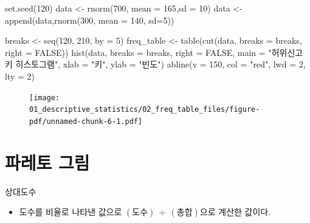 \documentclass[
  letterpaper,
  DIV=11,
  numbers=noendperiod]{scrreprt}
\newenvironment{Shaded}{\begin{snugshade}}{\end{snugshade}}
\newcommand{\AttributeTok}[1]{\textcolor[rgb]{0.40,0.45,0.13}{#1}}
\newcommand{\ConstantTok}[1]{\textcolor[rgb]{0.56,0.35,0.01}{#1}}
\newcommand{\DecValTok}[1]{\textcolor[rgb]{0.68,0.00,0.00}{#1}}
\newcommand{\FunctionTok}[1]{\textcolor[rgb]{0.28,0.35,0.67}{#1}}
\newcommand{\NormalTok}[1]{\textcolor[rgb]{0.00,0.23,0.31}{#1}}
\newcommand{\OtherTok}[1]{\textcolor[rgb]{0.00,0.23,0.31}{#1}}
\newcommand{\StringTok}[1]{\textcolor[rgb]{0.13,0.47,0.30}{#1}}
\providecommand{\tightlist}{%
  \setlength{\itemsep}{0pt}\setlength{\parskip}{0pt}}\usepackage{longtable,booktabs,array}
\begin{document}
\begin{Shaded}
\begin{Highlighting}[]
\FunctionTok{set.seed}\NormalTok{(}\DecValTok{120}\NormalTok{)}
\NormalTok{data }\OtherTok{\textless{}{-}} \FunctionTok{rnorm}\NormalTok{(}\DecValTok{700}\NormalTok{, }\AttributeTok{mean =} \DecValTok{165}\NormalTok{,}\AttributeTok{sd =} \DecValTok{10}\NormalTok{)}
\NormalTok{data }\OtherTok{\textless{}{-}} \FunctionTok{append}\NormalTok{(data,}\FunctionTok{rnorm}\NormalTok{(}\DecValTok{300}\NormalTok{, }\AttributeTok{mean =} \DecValTok{140}\NormalTok{, }\AttributeTok{sd=}\DecValTok{5}\NormalTok{))}


\NormalTok{breaks }\OtherTok{\textless{}{-}} \FunctionTok{seq}\NormalTok{(}\DecValTok{120}\NormalTok{, }\DecValTok{210}\NormalTok{, }\AttributeTok{by =} \DecValTok{5}\NormalTok{)}
\NormalTok{freq\_table }\OtherTok{\textless{}{-}} \FunctionTok{table}\NormalTok{(}\FunctionTok{cut}\NormalTok{(data, }\AttributeTok{breaks =}\NormalTok{ breaks, }\AttributeTok{right =} \ConstantTok{FALSE}\NormalTok{))}
\FunctionTok{hist}\NormalTok{(data, }\AttributeTok{breaks =}\NormalTok{ breaks, }\AttributeTok{right =} \ConstantTok{FALSE}\NormalTok{, }\AttributeTok{main =} \StringTok{"허위신고 키 히스토그램"}\NormalTok{, }\AttributeTok{xlab =} \StringTok{"키"}\NormalTok{, }\AttributeTok{ylab =} \StringTok{"빈도"}\NormalTok{)}
\FunctionTok{abline}\NormalTok{(}\AttributeTok{v =} \DecValTok{150}\NormalTok{, }\AttributeTok{col =} \StringTok{"red"}\NormalTok{, }\AttributeTok{lwd =} \DecValTok{2}\NormalTok{, }\AttributeTok{lty =} \DecValTok{2}\NormalTok{)}
\end{Highlighting}
\end{Shaded}

\begin{figure}[H]

{\centering \texttt{[image: 01\_descriptive\_statistics/02\_freq\_table\_files/figure-pdf/unnamed-chunk-6-1.pdf]}

}

\end{figure}

\hypertarget{uxd30cuxb808uxd1a0-uxadf8uxb9bc}{%
\chapter{파레토 그림}\label{uxd30cuxb808uxd1a0-uxadf8uxb9bc}}

상대도수

\begin{itemize}
\tightlist
\item
  도수를 비율로 나타낸 값으로 \((도수)\ \div\ (총합)\)으로 계산한
  값이다.
\end{itemize}
\end{document}
